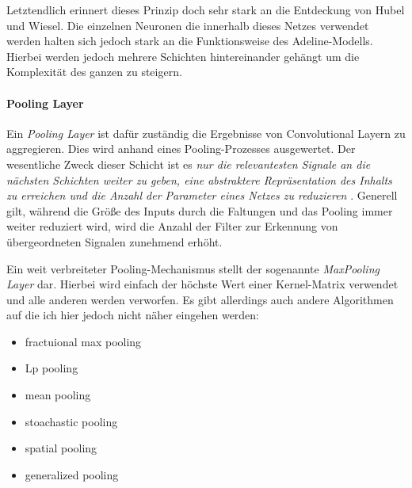 Letztendlich erinnert dieses Prinzip doch sehr stark an die Entdeckung von Hubel und Wiesel. Die einzelnen Neuronen die innerhalb dieses Netzes verwendet werden halten sich jedoch stark an die Funktionsweise des Adeline-Modells. Hierbei werden jedoch mehrere Schichten hintereinander gehängt um die Komplexität des ganzen zu steigern. 

\paragraph{Pooling Layer}
Ein \emph{Pooling Layer} ist dafür zuständig die Ergebnisse von Convolutional Layern zu aggregieren. Dies wird anhand eines Pooling-Prozesses ausgewertet. Der wesentliche Zweck dieser Schicht ist es \emph{nur die relevantesten Signale an die nächsten Schichten weiter zu geben, eine abstraktere Repräsentation des Inhalts zu erreichen und die Anzahl der Parameter eines Netzes zu reduzieren} \cite{cnnFunktionsweise2}. Generell gilt, während die Größe des Inputs durch die Faltungen und das Pooling immer weiter reduziert wird, wird die Anzahl der Filter zur Erkennung von übergeordneten Signalen zunehmend erhöht.

Ein weit verbreiteter Pooling-Mechanismus stellt der sogenannte \emph{MaxPooling Layer} dar. Hierbei wird einfach der höchste Wert einer Kernel-Matrix verwendet und alle anderen werden verworfen. Es gibt allerdings auch andere Algorithmen auf die ich hier jedoch nicht näher eingehen werden: 

\begin{multicols}{2}
\begin{itemize}
\item fractuional max pooling
\item Lp pooling
\item mean pooling
\item stoachastic pooling
\item spatial pooling
\item generalized pooling
\end{itemize}
\end{multicols}


